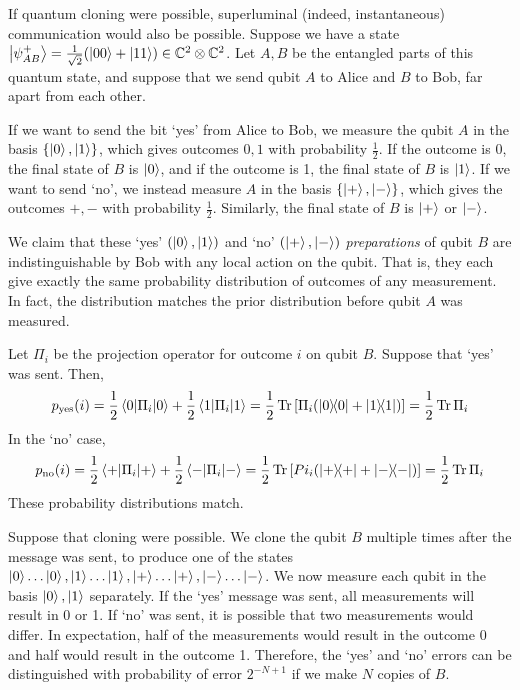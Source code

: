 If quantum cloning were possible, superluminal (indeed, instantaneous) communication would also be possible.
Suppose we have a state \( \ket{\psi^+_{AB}} = \frac{1}{\sqrt{2}} \qty(\ket{00} + \ket{11}) \in \mathbb C^2 \otimes \mathbb C^2 \).
Let \( A, B \) be the entangled parts of this quantum state, and suppose that we send qubit \( A \) to Alice and \( B \) to Bob, far apart from each other.

If we want to send the bit `yes' from Alice to Bob, we measure the qubit \( A \) in the basis \( \qty{\ket{0}, \ket{1}} \), which gives outcomes \( 0, 1 \) with probability \( \frac{1}{2} \).
If the outcome is 0, the final state of \( B \) is \( \ket{0} \), and if the outcome is 1, the final state of \( B \) is \( \ket{1} \).
If we want to send `no', we instead measure \( A \) in the basis \( \qty{\ket{+}, \ket{-}} \), which gives the outcomes \( +, - \) with probability \( \frac{1}{2} \).
Similarly, the final state of \( B \) is \( \ket{+} \) or \( \ket{-} \).

We claim that these `yes' \( (\ket{0}, \ket{1}) \) and `no' \( (\ket{+}, \ket{-}) \) \emph{preparations} of qubit \( B \) are indistinguishable by Bob with any local action on the qubit.
That is, they each give exactly the same probability distribution of outcomes of any measurement.
In fact, the distribution matches the prior distribution before qubit \( A \) was measured.

Let \( \Pi_i \) be the projection operator for outcome \( i \) on qubit \( B \).
Suppose that `yes' was sent.
Then,
\[ p_{\text{yes}}(i) = \frac{1}{2}\ev{\Pi_i}{0} + \frac{1}{2}\ev{\Pi_i}{1} = \frac{1}{2} \Tr \qty[\Pi_i \qty(\op{0}{0} + \op{1}{1})] = \frac{1}{2} \Tr \Pi_i \]
In the `no' case,
\[ p_{\text{no}}(i) = \frac{1}{2}\ev{\Pi_i}{+} + \frac{1}{2}\ev{\Pi_i}{-} = \frac{1}{2} \Tr \qty[Pi_i \qty(\op{+}{+} + \op{-}{-})] = \frac{1}{2} \Tr \Pi_i \]
These probability distributions match.

Suppose that cloning were possible.
We clone the qubit \( B \) multiple times after the message was sent, to produce one of the states \( \ket{0} \dots \ket{0}, \ket{1} \dots \ket{1}, \ket{+} \dots \ket{+}, \ket{-} \dots \ket{-} \).
We now measure each qubit in the basis \( \ket{0}, \ket{1} \) separately.
If the `yes' message was sent, all measurements will result in 0 or 1.
If `no' was sent, it is possible that two measurements would differ.
In expectation, half of the measurements would result in the outcome 0 and half would result in the outcome 1.
Therefore, the `yes' and `no' errors can be distinguished with probability of error \( 2^{-N+1} \) if we make \( N \) copies of \( B \).

